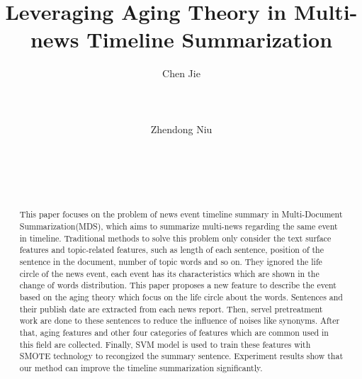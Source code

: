 \documentclass{acm_proc_article-sp}
\begin{document}
%
\title {Leveraging  Aging Theory in Multi-news Timeline Summarization} 

\author{
\alignauthor
Chen Jie\\
     \\
       \\
       \\
\alignauthor
Zhendong Niu\\
         \\
       \\
       \\
       \\
}
\maketitle
\begin{abstract}


This paper focuses on the problem of news event timeline summary in Multi-Document Summarization(MDS), which aims to summarize multi-news regarding the same event in timeline.
Traditional methods to solve this problem only consider the text surface features and topic-related features, such as length of each sentence, position of the sentence in the document, number of topic words and so on.
They ignored the life circle of the news event, each event has its characteristics which are shown in the change of words distribution.
This paper proposes a new feature to describe the event based on the aging theory which focus on the life circle about the words.
Sentences and their publish date are extracted from each news report.
Then, servel pretreatment work are done to these sentences to reduce the influence of noises like synonyms.
After that, aging features and other four categories of features which are common used in this field are collected.
Finally, SVM model is used to train these features with SMOTE technology to recongized the summary sentence.
Experiment results show that our method can improve the timeline summarization significantly.

\end{abstract}
\end{document}
